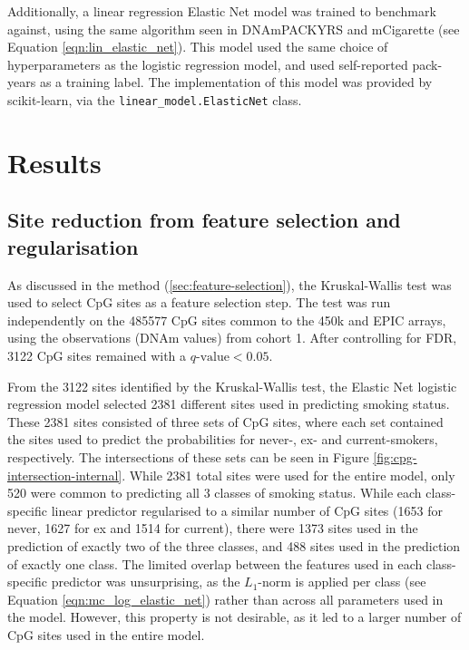 \documentclass{article} %
\begin{document}
Additionally, a linear regression Elastic Net model was trained to benchmark against, using the same algorithm seen in DNAmPACKYRS and mCigarette (see Equation \ref{eqn:lin_elastic_net}). This model used the same choice of hyperparameters as the logistic regression model, and used self-reported pack-years as a training label. The implementation of this model was provided by scikit-learn, via the \verb|linear_model.ElasticNet| class.

\newpage
\section{Results} \label{sec:results}

\subsection{Site reduction from feature selection and regularisation}
As discussed in the method (\ref{sec:feature-selection}), the Kruskal-Wallis test was used to select CpG sites as a feature selection step. The test was run independently on the \num{485577} CpG sites common to the 450k and EPIC arrays, using the observations (DNAm values) from cohort 1. After controlling for FDR, \num{3122} CpG sites remained with a \(q\text{-value} < 0.05\).

From the \num{3122} sites identified by the Kruskal-Wallis test, the Elastic Net logistic regression model selected \num{2381} different sites used in predicting smoking status. These \num{2381} sites consisted of three sets of CpG sites, where each set contained the sites used to predict the probabilities for never-, ex- and current-smokers, respectively.
The intersections of these sets can be seen in Figure \ref{fig:cpg-intersection-internal}. While \num{2381} total sites were used for the entire model, only \num{520} were common to predicting all 3 classes of smoking status. While each class-specific linear predictor regularised to a similar number of CpG sites (\num{1653} for never, \num{1627} for ex and \num{1514} for current), there were \num{1373} sites used in the prediction of exactly two of the three classes, and \num{488} sites used in the prediction of exactly one class. The limited overlap between the features used in each class-specific predictor was unsurprising, as the \(L_1\)-norm is applied per class (see Equation \ref{eqn:mc_log_elastic_net}) rather than across all parameters used in the model. However, this property is not desirable, as it led to a larger number of CpG sites used in the entire model.
\end{document}

